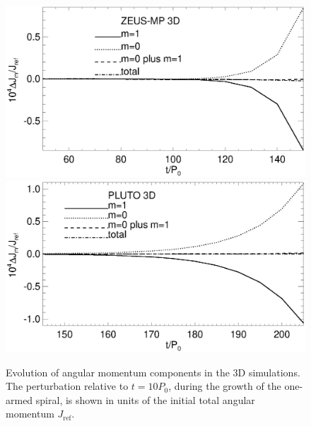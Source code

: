 \begin{figure}
  \includegraphics[scale=.41,clip=true,trim=0cm 1cm 0cm 0cm]{figures/nonaxi_evol_ang_zeus}
  \includegraphics[scale=.41]{figures/nonaxi_evol_ang_pluto}
  \caption{Evolution of angular momentum components in the 3D 
    simulations. The perturbation 
    relative to $t=10P_0$, during the growth of the one-armed spiral,
    is shown in units of the initial total angular momentum
    $J_\mathrm{ref}$.\label{3d_angmom}}  
\end{figure}   

